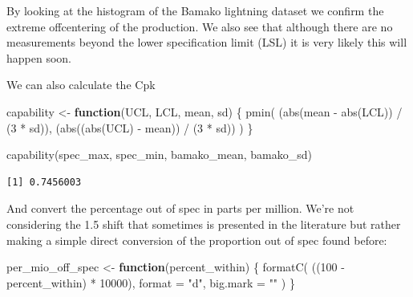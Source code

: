 \documentclass[
]{book}
\newenvironment{Shaded}{\begin{snugshade}}{\end{snugshade}}
\newcommand{\AttributeTok}[1]{\textcolor[rgb]{0.77,0.63,0.00}{#1}}
\newcommand{\ControlFlowTok}[1]{\textcolor[rgb]{0.13,0.29,0.53}{\textbf{#1}}}
\newcommand{\DecValTok}[1]{\textcolor[rgb]{0.00,0.00,0.81}{#1}}
\newcommand{\FunctionTok}[1]{\textcolor[rgb]{0.00,0.00,0.00}{#1}}
\newcommand{\NormalTok}[1]{#1}
\newcommand{\OtherTok}[1]{\textcolor[rgb]{0.56,0.35,0.01}{#1}}
\newcommand{\SpecialCharTok}[1]{\textcolor[rgb]{0.00,0.00,0.00}{#1}}
\newcommand{\StringTok}[1]{\textcolor[rgb]{0.31,0.60,0.02}{#1}}
\begin{document}
By looking at the histogram of the Bamako lightning dataset we confirm the extreme offcentering of the production. We also see that although there are no measurements beyond the lower specification limit (LSL) it is very likely this will happen soon.

We can also calculate the Cpk

\begin{Shaded}
\begin{Highlighting}[]
\NormalTok{capability }\OtherTok{\textless{}{-}} \ControlFlowTok{function}\NormalTok{(UCL, LCL, mean, sd) \{}
  \FunctionTok{pmin}\NormalTok{(}
\NormalTok{    (}\FunctionTok{abs}\NormalTok{(mean }\SpecialCharTok{{-}} \FunctionTok{abs}\NormalTok{(LCL)) }\SpecialCharTok{/}\NormalTok{ (}\DecValTok{3} \SpecialCharTok{*}\NormalTok{ sd)),}
\NormalTok{    (}\FunctionTok{abs}\NormalTok{((}\FunctionTok{abs}\NormalTok{(UCL) }\SpecialCharTok{{-}}\NormalTok{ mean)) }\SpecialCharTok{/}\NormalTok{ (}\DecValTok{3} \SpecialCharTok{*}\NormalTok{ sd))}
\NormalTok{   )}
\NormalTok{\}}
\end{Highlighting}
\end{Shaded}

\begin{Shaded}
\begin{Highlighting}[]
\FunctionTok{capability}\NormalTok{(spec\_max, spec\_min, bamako\_mean, bamako\_sd)}
\end{Highlighting}
\end{Shaded}

\begin{verbatim}
[1] 0.7456003
\end{verbatim}

And convert the percentage out of spec in parts per million. We're not considering the 1.5 shift that sometimes is presented in the literature but rather making a simple direct conversion of the proportion out of spec found before:

\begin{Shaded}
\begin{Highlighting}[]
\NormalTok{per\_mio\_off\_spec }\OtherTok{\textless{}{-}} \ControlFlowTok{function}\NormalTok{(percent\_within) \{}
  \FunctionTok{formatC}\NormalTok{(}
\NormalTok{  ((}\DecValTok{100} \SpecialCharTok{{-}}\NormalTok{ percent\_within) }\SpecialCharTok{*} \DecValTok{10000}\NormalTok{),}
  \AttributeTok{format =} \StringTok{"d"}\NormalTok{,}
  \AttributeTok{big.mark =} \StringTok{"\textquotesingle{}"}
\NormalTok{  )}
\NormalTok{\}}
\end{Highlighting}
\end{Shaded}
\end{document}
